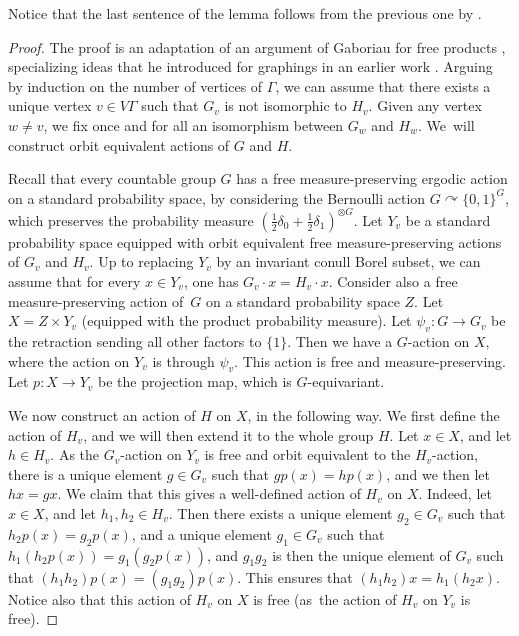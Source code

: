 Notice that the last sentence of the lemma follows from the previous one by \cite[Th.\,2.3]{Gab2}.

\begin{proof}
The proof is an adaptation of an argument of Gaboriau for free products \cite[$\mathbf{P}_{\mathrm{ME}}\mathbf{6}$]{Gab}, specializing ideas that he introduced for graphings in an earlier work \cite[Part\,IV]{Gab-cost}. Arguing by induction on the number of vertices of $\Gamma$, we can assume that there exists a unique vertex $v\in V\Gamma$ such that $G_v$ is not isomorphic to $H_v$. Given any vertex $w\neq v$, we fix once and for all an isomorphism between $G_w$ and $H_w$. We~will construct orbit equivalent actions of $G$ and $H$.

Recall that every countable group $G$ has a free measure-preserving ergodic action on a standard probability space, by considering the Bernoulli action $G\curvearrowright\{0,1\}^G$, which preserves the probability measure $\left(\frac{1}{2}\delta_0+\frac{1}{2}\delta_1\right)^{\otimes G}$. Let $Y_v$ be a standard probability space equipped with orbit equivalent free measure-preserving actions of $G_v$ and $H_v$. Up to replacing $Y_v$ by an invariant conull Borel subset, we can assume that for every $x\in Y_v$, one has $G_v\cdot x=H_v\cdot x$. Consider also a free measure-preserving action of~$G$ on a standard probability space $Z$. Let $X=Z\times Y_v$ (equipped with the product probability measure). Let $\psi_v:G\to G_v$ be the retraction sending all other factors to $\{1\}$. Then we have a $G$-action on $X$, where the action on $Y_v$ is through $\psi_v$. This action is free and measure-preserving. Let $p:X\to Y_v$ be the projection map, which is $G$-equivariant.

We now construct an action of $H$ on $X$, in the following way. We first define the action of $H_v$, and we will then extend it to the whole group $H$. Let $x\in X$, and let $h\in H_v$. As the $G_v$-action on $Y_v$ is free and orbit equivalent to the $H_v$-action, there is a unique element $g\in G_v$ such that $gp(x)=hp(x)$, and we then let $hx=gx$. We claim that this gives a well-defined action of $H_v$ on $X$. Indeed, let $x\in X$, and let $h_1,h_2\in H_v$. Then there exists a unique element $g_2\in G_v$ such that $h_2p(x)=g_2p(x)$, and a unique element $g_1\in G_v$ such that $h_1(h_2p(x))=g_1(g_2p(x))$, and $g_1g_2$ is then the unique element of $G_v$ such that $(h_1h_2)p(x)=(g_1g_2)p(x)$. This ensures that $(h_1h_2)x=h_1(h_2x)$. Notice also that this action of $H_v$ on $X$ is free (as~the action of $H_v$ on $Y_v$ is free).


\end{proof}
